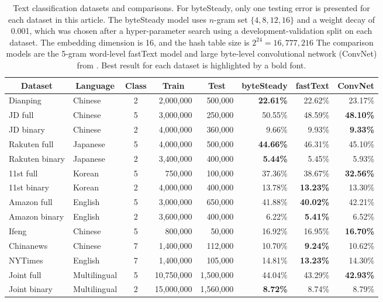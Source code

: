 \documentclass{article}
\begin{document}
\begin{table}[t]
  \caption{Text classification datasets and comparisons. For byteSteady, only one testing error is presented for each dataset in this article. The byteSteady model uses \(n\)-gram set \(\{4,8,12,16\}\) and a weight decay of 0.001, which was chosen after a hyper-parameter search using a development-validation split on each dataset. The embedding dimension is 16, and the hash table size is \(2^{24}=16,777,216\) The comparison models are the 5-gram word-level fastText model and large byte-level convolutional network (ConvNet) from \cite{ZL17}. Best result for each dataset is highlighted by a bold font.}
  \label{tab:text}
  \begin{center}
    \addtolength{\tabcolsep}{-3pt}
    \begin{tabular}{llcrrrrr}
      \hline
      \multicolumn{1}{c}{\textbf{Dataset}}  & \multicolumn{1}{c}{\textbf{Language}}  & \multicolumn{1}{c}{\textbf{Class}} & \multicolumn{1}{c}{\textbf{Train}} & \multicolumn{1}{c}{\textbf{Test}}& \multicolumn{1}{c}{\textbf{byteSteady}}& \multicolumn{1}{c}{\textbf{fastText}}& \multicolumn{1}{c}{\textbf{ConvNet}} \\ \hline
      Dianping & Chinese & 2 & 2,000,000 & 500,000 & \textbf{22.61\%} & 22.62\% & 23.17\% \\
      JD full & Chinese & 5 & 3,000,000 & 250,000 & 50.55\% & 48.59\% & \textbf{48.10\%} \\
      JD binary & Chinese & 2 & 4,000,000 & 360,000 & 9.66\% & 9.93\% & \textbf{9.33\%} \\
      Rakuten full & Japanese & 5 & 4,000,000 & 500,000 & \textbf{44.66\%} & 46.31\% & 45.10\% \\
      Rakuten binary & Japanese & 2 & 3,400,000 & 400,000 & \textbf{5.44\%} & 5.45\% & 5.93\% \\
      11st full & Korean & 5 & 750,000 & 100,000 & 37.36\% & 38.67\% & \textbf{32.56\%} \\
      11st binary & Korean & 2 & 4,000,000 & 400,000 & 13.78\% & \textbf{13.23\%} & 13.30\% \\
      Amazon full & English & 5 & 3,000,000 & 650,000 & 41.88\% & \textbf{40.02\%} & 42.21\% \\
      Amazon binary & English & 2 & 3,600,000 & 400,000 & 6.22\% & \textbf{5.41\%} & 6.52\% \\
      Ifeng & Chinese & 5 & 800,000 & 50,000 & 16.92\% & 16.95\% & \textbf{16.70\%} \\
      Chinanews & Chinese & 7 & 1,400,000 & 112,000 & 10.70\% & \textbf{9.24\%} & 10.62\% \\
      NYTimes & English & 7 & 1,400,000 & 105,000 & 14.81\% & \textbf{13.23\%} & 14.30\% \\
      Joint full & Multilingual & 5 & 10,750,000 & 1,500,000 & 44.04\% & 43.29\% & \textbf{42.93\%} \\
      Joint binary & Multilingual & 2 & 15,000,000 & 1,560,000 & \textbf{8.72\%} & 8.74\% & 8.79\% \\
      \hline
    \end{tabular}
    \addtolength{\tabcolsep}{3pt}
  \end{center}
\end{table}
\end{document}
